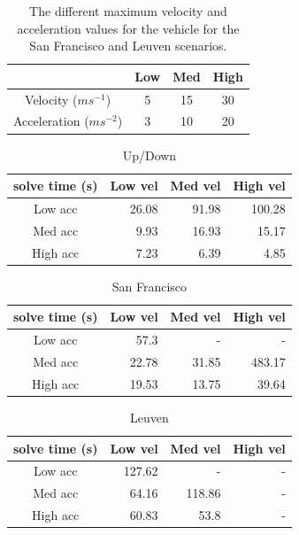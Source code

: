 \begin{table}[h]
\centering
\begin{tabular}{ c || c | c | c}
 & Low & Med & High \\
\hline\hline
Velocity ($ms^{-1}$) 	& 5		& 15	& 30 	\\ 
\hline
Acceleration ($ms^{-2}$)& 3		& 10	& 20 	\\  
\end{tabular}
\caption{The different maximum velocity and acceleration values for the vehicle for the San Francisco and Leuven scenarios.}
\label{table:sf-leuven-agility}
\end{table}

\clearpage

\begin{table}[]
\centering
\begin{tabular}{ c || r | r | r}
solve time (s) & Low vel& Med vel& High vel\\
\hline\hline
Low acc 	& 26.08		& 91.98		& 100.28	\\ \hline
Med acc		& 9.93		& 16.93		& 15.17		\\  \hline
High acc	& 7.23		& 6.39		& 4.85 		\\  
\end{tabular}
\caption{Up/Down}
\label{table:synth-agility-data}
\end{table}

\begin{table}[]
\centering
\begin{tabular}{ c || r | r | r}
solve time (s) & Low vel& Med vel& High vel\\
\hline\hline
Low acc 	& 57.3		& -			& -			\\ \hline
Med acc		& 22.78		& 31.85		& 483.17	\\  \hline
High acc	& 19.53		& 13.75		& 39.64 		\\  
\end{tabular}
\caption{San Francisco}
\label{table:sf-agility-data}
\end{table}


\begin{table}[]
\centering
\begin{tabular}{ c || r | r | r}
solve time (s) & Low vel& Med vel& High vel\\
\hline\hline
Low acc 	& 127.62	& -			& -			\\ \hline
Med acc		& 64.16		& 118.86	& -			\\  \hline
High acc	& 60.83		& 53.8		& - 		\\  
\end{tabular}
\caption{Leuven}
\label{table:leuven-agility-data}
\end{table}

